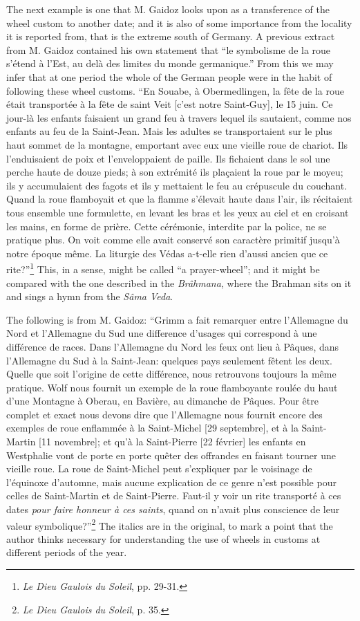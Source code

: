\documentclass[a4paper, 11pt, oneside, polutonikogreek, english]{article}
\begin{document}
The next example is one that M. Gaidoz looks upon as a transference of the wheel custom to another date; and it is also of some importance from the locality it is reported from, that is the extreme south of Germany. A previous extract from M. Gaidoz contained his own statement that ``le symbolisme de la roue s'étend à l'Est, au delà des limites du monde germanique.'' From this we may infer that at one period the whole of the German people were in the habit of following these wheel customs. ``En Souabe, à Obermedlingen, la fête de la roue était transportée à la fête de saint Veit [c'est notre Saint-Guy], le 15 juin. Ce jour-là les enfants faisaient un grand feu à travers lequel ils sautaient, comme nos enfants au feu de la Saint-Jean. Mais les adultes se transportaient sur le plus haut sommet de la montagne, emportant avec eux une vieille roue de chariot. Ils l'enduisaient de poix et l'enveloppaient de paille. Ils fichaient dans le sol une perche haute de douze pieds; à son extrémité ils plaçaient la roue par le moyeu; ils y accumulaient des fagots et ils y mettaient le feu au crépuscule du couchant. Quand la roue flamboyait et que la flamme s'élevait haute dans l'air, ils récitaient tous ensemble une formulette, en levant les bras et les yeux au ciel et en croisant les mains, en forme de prière. Cette cérémonie, interdite par la police, ne se pratique plus. On voit comme elle avait conservé son caractère primitif jusqu'à notre époque même. La liturgie des Védas a-t-elle rien d'aussi ancien que ce rite?''\footnote{\emph{Le Dieu Gaulois du Soleil}, pp. 29-31.} This, in a sense, might be called ``a prayer-wheel''; and it might be compared with the one described in the \emph{Brâhmana}, where the Brahman sits on it and sings a hymn from the \emph{Sâma Veda}.

The following is from M. Gaidoz: ``Grimm a fait remarquer entre l'Allemagne du Nord et l'Allemagne du Sud une difference d'usages qui correspond à une différence de races. Dans l'Allemagne du Nord les feux ont lieu à Pâques, dans l'Allemagne du Sud à la Saint-Jean: quelques pays seulement fêtent les deux. Quelle que soit l'origine de cette différence, nous retrouvons toujours la même pratique. Wolf nous fournit un exemple de la roue flamboyante roulée du haut d'une Montagne à Oberau, en Bavière, au dimanche de Pâques. Pour être complet et exact nous devons dire que l'Allemagne nous fournit encore des exemples de roue enflammée à la Saint-Michel [29 septembre], et à la Saint-Martin [11 novembre]; et qu'à la Saint-Pierre [22 février] les enfants en Westphalie vont de porte en porte quêter des offrandes en faisant tourner une vieille roue. La roue de Saint-Michel peut s'expliquer par le voisinage de l'équinoxe d'automne, mais aucune explication de ce genre n'est possible pour celles de Saint-Martin et de Saint-Pierre. Faut-il y voir un rite transporté à ces dates \emph{pour faire honneur à ces saints}, quand on n'avait plus conscience de leur valeur symbolique?''\footnote{\emph{Le Dieu Gaulois du Soleil}, p. 35.} The italics are in the original, to mark a point that the author thinks necessary for understanding the use of wheels in customs at different periods of the year.
\end{document}
